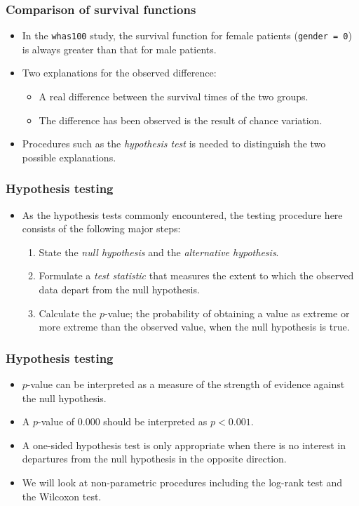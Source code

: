 \documentclass[10pt]{beamer}\usepackage[]{graphicx}\usepackage[]{color}
\newcommand{\empr}[1]{{\emph{\color{red}#1}}}
\newcommand{\code}[1]{{\texttt{#1}}}
\begin{document}
\begin{frame}
  \frametitle{Comparison of survival functions}
  \begin{itemize}
  \item In the \code{whas100} study, 
    the survival function for female patients (\code{gender = 0}) is always greater than 
    that for male patients.
  \item Two explanations for the observed difference:
    \begin{itemize}
    \item A real difference between the survival times of the two groups.
    \item The difference has been observed is the result of chance variation. 
    \end{itemize}
  \item Procedures such as the \empr{hypothesis test} is needed to distinguish 
    the two possible explanations. 
  \end{itemize}
\end{frame}

\begin{frame}
  \frametitle{Hypothesis testing}
  \begin{itemize}
  \item As the hypothesis tests commonly encountered, 
    the testing procedure here consists of the following major steps:
    \begin{enumerate}
    \item State the \empr{null hypothesis} and the \empr{alternative hypothesis}. 
    \item Formulate a \empr{test statistic} that measures the extent to which 
      the observed data depart from the null hypothesis. 
    \item Calculate the $p$-value; the probability of obtaining a value as extreme 
      or more extreme than the observed value, when the null hypothesis is true. 
    \end{enumerate}
  \end{itemize}
\end{frame}

\begin{frame}
  \frametitle{Hypothesis testing}
  \begin{itemize}
  \item $p$-value can be interpreted as a measure of the strength of evidence 
    against the null hypothesis.
  \item A $p$-value of 0.000 should be interpreted as $p < 0.001$.
  \item A one-sided hypothesis test is only appropriate when there is 
    no interest in departures from the null hypothesis in the opposite direction.
  \item We will look at non-parametric procedures including the log-rank test and the Wilcoxon test.
  \end{itemize}
\end{frame}
\end{document}
